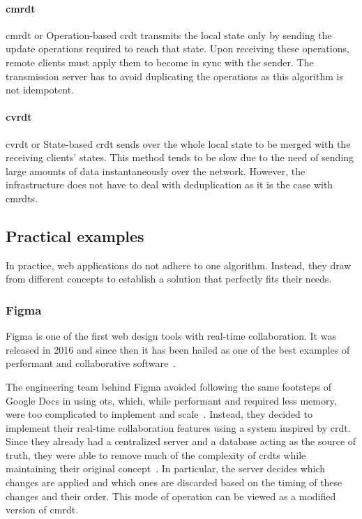 \paragraph{\acrshort{cmrdt}}

\acrlong{cmrdt} or Operation-based \acrshort{crdt} transmits the local state only by sending the update operations required to reach that state.
Upon receiving these operations, remote clients must apply them to become in sync with the sender. The transmission server has to avoid duplicating the operations as this algorithm is not idempotent.

\paragraph{\acrshort{cvrdt}}

\acrlong{cvrdt} or State-based \acrshort{crdt} sends over the whole local state to be merged with the receiving clients' states. This method tends to be slow due to the need of sending large amounts of data instantaneously over the network. However, the infrastructure does not have to deal with deduplication as it is the case with \acrshort{cmrdt}s.

\subsection{Practical examples}

In practice, web applications do not adhere to one algorithm.
Instead, they draw from different concepts to establish a solution that perfectly fits their needs.

\subsubsection{Figma}


Figma is one of the first web design tools with real-time collaboration.
It was released in 2016 and since then it has been hailed as one of the best examples of performant and collaborative software~\autocite{tools_2020_nodate}.

The engineering team behind Figma avoided following the same footsteps of Google Docs in using \acrshort{ot}s, which, while performant and required less memory, were too complicated to implement and scale~\autocite{wallace_how_nodate}.
Instead, they decided to implement their real-time collaboration features using a system inspired by \acrshort{crdt}.
Since they already had a centralized server and a database acting as the source of truth, they were able to remove much of the complexity of \acrshort{crdt}s while maintaining their original concept~\autocite{wallace_how_nodate}.
In particular, the server decides which changes are applied and which ones are discarded based on the timing of these changes and their order.
This mode of operation can be viewed as a modified version of \acrshort{cmrdt}.

